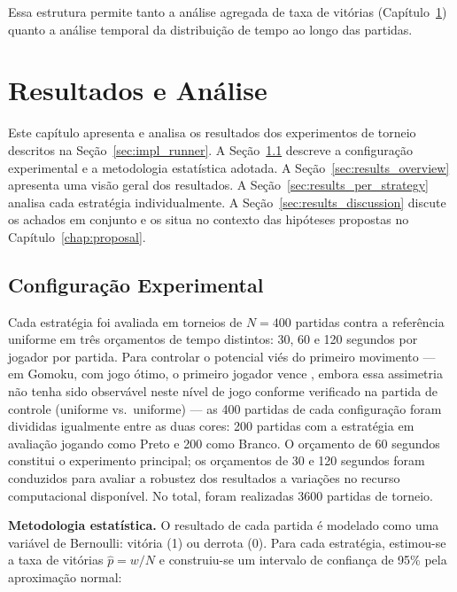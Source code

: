 \documentclass[cic,tc]{iiufrgs}
\begin{document}
Essa estrutura permite tanto a análise agregada de taxa de vitórias (Capítulo~\ref{chap:results}) quanto a análise temporal da distribuição de tempo ao longo das partidas.

\chapter{Resultados e Análise}
\label{chap:results}

Este capítulo apresenta e analisa os resultados dos experimentos de torneio descritos na Seção~\ref{sec:impl_runner}. A Seção~\ref{sec:exp_setup} descreve a configuração experimental e a metodologia estatística adotada. A Seção~\ref{sec:results_overview} apresenta uma visão geral dos resultados. A Seção~\ref{sec:results_per_strategy} analisa cada estratégia individualmente. A Seção~\ref{sec:results_discussion} discute os achados em conjunto e os situa no contexto das hipóteses propostas no Capítulo~\ref{chap:proposal}.

\section{Configuração Experimental}
\label{sec:exp_setup}

Cada estratégia foi avaliada em torneios de $N = 400$ partidas contra a referência uniforme em três orçamentos de tempo distintos: 30, 60 e 120 segundos por jogador por partida. Para controlar o potencial viés do primeiro movimento — em Gomoku, com jogo ótimo, o primeiro jogador vence \cite{allis1994searching}, embora essa assimetria não tenha sido observável neste nível de jogo conforme verificado na partida de controle (uniforme vs.\ uniforme) — as 400 partidas de cada configuração foram divididas igualmente entre as duas cores: 200 partidas com a estratégia em avaliação jogando como Preto e 200 como Branco. O orçamento de 60 segundos constitui o experimento principal; os orçamentos de 30 e 120 segundos foram conduzidos para avaliar a robustez dos resultados a variações no recurso computacional disponível. No total, foram realizadas 3600 partidas de torneio.

\textbf{Metodologia estatística.} O resultado de cada partida é modelado como uma variável de Bernoulli: vitória (1) ou derrota (0). Para cada estratégia, estimou-se a taxa de vitórias $\hat{p} = w / N$ e construiu-se um intervalo de confiança de 95\% pela aproximação normal:
\end{document}

